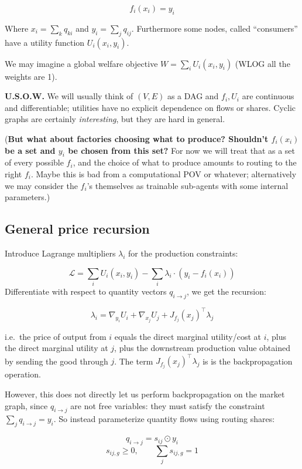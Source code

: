 \[f_i(x_i)=y_i\]

Where \(x_i=\sum_k q_{ki}\) and \(y_i=\sum_j q_{ij}\). Furthermore some nodes, called ``consumers'' have a utility function \(U_i(x_i,y_i)\).

We may imagine a global welfare objective \(W = \sum_i U_i(x_i, y_i)\) (WLOG all the weights are 1).

\textbf{U.S.O.W.} We will usually think of \((V,E)\) as a DAG and \(f_i, U_i\) are continuous and differentiable; utilities have no explicit dependence on flows or shares. Cyclic graphs are certainly \emph{interesting}, but they are hard in general.

(\textbf{But what about factories choosing what to produce? Shouldn't \(f_{i}(x_i)\) be a set and \(y_i\) be chosen from this set?} For now we will treat that as a set of every possible \(f_i\), and the choice of what to produce amounts to routing to the right \(f_i\). Maybe this is bad from a computational POV or whatever; alternatively we may consider the \(f_i\)'s themselves as trainable sub-agents with some internal parameters.)

\hypertarget{general-price-recursion}{%
\subsection{General price recursion}\label{general-price-recursion}}

Introduce Lagrange multipliers \(\lambda_i\) for the production constraints:

\[\mathcal L = \sum_i U_i(x_i,y_i) -\sum_i \lambda_i\cdot (y_i-f_i(x_i))\] Differentiate with respect to quantity vectors \(q_{i\to j}\), we get the recursion:

\[\lambda_i=\nabla_{y_i}U_i+\nabla_{x_j}U_j+J_{f_j}(x_j)^\top\lambda_j\tag{1.1}\]

i.e.~the price of output from \(i\) equals the direct marginal utility/cost at \(i\), plus the direct marginal utility at \(j\), plus the downstream production value obtained by sending the good through \(j\). The term \(J_{f_j}(x_j)^\top\lambda_j\) is is the backpropagation operation.

However, this does not directly let us perform backpropagation on the market graph, since \(q_{i\to j}\) are not free variables: they must satisfy the constraint \(\sum_j q_{i\to j}=y_i\). So instead parameterize quantity flows using routing shares:

\[q_{i\to j}=s_{ij}\odot y_i\] \[s_{ij,g}\geq 0,\qquad \sum_j s_{ij,g}=1\]

